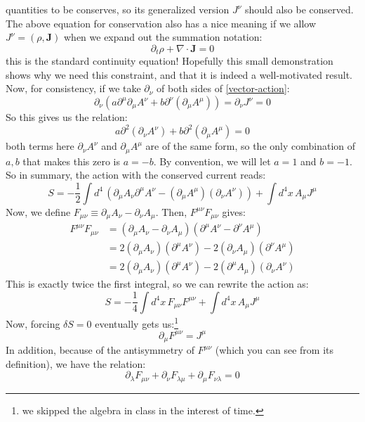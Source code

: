 quantities to be conserves, so its generalized version \( J^{\nu} \) should also be conserved. The above
equation for conservation also has a nice meaning if we allow \( J^{\nu} = (\rho, \mathbf{J}) \) when we
expand out the summation notation:
\[
	\partial_t \rho + \nabla \cdot \mathbf{J} = 0
\]
this is the standard continuity equation! Hopefully this small demonstration shows why we need this constraint, and
that it is indeed a well-motivated result. Now, for consistency, if we take \( \partial_\nu \) of both sides
of \cref{vector-action}:
\[
	\partial_\nu \left( a \partial^{\mu}\partial_\mu A^{\nu} + b \partial^{\nu}\left( \partial_\mu A^{\mu}
	\right) \right) = \partial_\nu J^{\nu} = 0
\]
So this gives us the relation:
\[
	a \partial^2 (\partial_\nu A^{\nu}) + b \partial^2 (\partial_\mu A^{\mu}) = 0
\]
both terms here \( \partial_\nu A^{\nu} \) and \( \partial_\mu A^{\mu} \) are of the same form, so the only
combination of \( a, b \) that makes this zero is \( a = -b \). By convention, we will let \( a = 1 \) and \(
b = -1\). So in summary, the action with the conserved current reads:
\[
	S = -\frac{1}{2}\int d^{4} \, \left( \partial_\mu A_\nu \partial^{\mu} A^{\nu} - (\partial_\mu A^{\mu})
	(\partial_\nu A^{\nu}) \right) + \int d^{4}x \, A_\mu J^{\mu}
\]
Now, we define \( F_{\mu \nu} \equiv \partial_\mu A_\nu - \partial_\nu A_\mu \). Then, \( F^{\mu \nu} F_{\mu
\nu} \) gives:
\begin{align*}
	F^{\mu \nu} F_{\mu \nu} &= \left( \partial_\mu A_\nu - \partial_\nu A_\mu \right)\left(
	\partial^{\mu}A^{\nu} - \partial^{\nu} A^{\mu} \right)\\
	&= 2(\partial_\mu A_\nu)(\partial^{\mu}A^{\nu}) - 2(\partial_\nu A_\mu)(\partial^{\nu}A^{\mu}) \\ 
	&= 2(\partial_\mu A_\nu) (\partial^{\mu}A^{\nu}) - 2(\partial^{\mu}A_\mu) (\partial_\nu A^{\nu}) 
\end{align*}
This is exactly twice the first integral, so we can rewrite the action as:
\[
	S = -\frac{1}{4}\int d^{4}x \, F_{\mu \nu} F^{\mu \nu} + \int d^{4}x \, A_\mu J^{\mu}
\]
Now, forcing \( \delta S = 0 \) eventually gets us:\footnote{we skipped the algebra in class in the interest
of time.}
\begin{equation}
	\label{maxwell-1}
	\partial_\mu F^{\mu \nu} = J^{\mu}
\end{equation}
In addition, because of the antisymmetry of \( F^{\mu \nu} \) (which you can see from its definition), we
have the relation:
\begin{equation}
	\label{maxwell-2}
	\partial_\lambda F_{\mu \nu} + \partial_\nu F_{\lambda \mu} + \partial_\mu F_{\nu \lambda} = 0
\end{equation}
